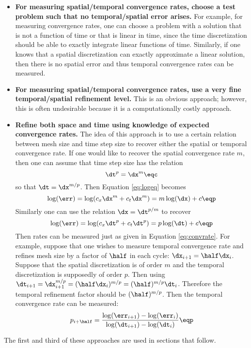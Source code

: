 \begin{itemize}
  \item \textbf{For measuring spatial/temporal convergence rates, choose a test problem
    such that no temporal/spatial error arises.} For example, for measuring
    convergence rates, one can choose a problem with a solution that is not
    a function of time or that is linear in time, since the time discretization
    should be able to exactly integrate linear functions of time.
    Similarly, if one knows that a spatial discretization can exactly
    approximate a linear solution, then there is no spatial error and thus
    temporal convergence rates can be measured.
  \item \textbf{For measuring spatial/temporal convergence rates, use a very
    fine temporal/spatial refinement level.}
    This is an obvious approach; however, this is often undesirable because it is
    a computationally costly approach.
  \item \textbf{Refine both space and time using knowledge of expected
    convergence rates.}
    The idea of this approach is to use a certain relation between mesh size
    and time step size to recover either the spatial or temporal convergence
    rate. If one would like to recover the spatial convergence rate $m$, then
    one can assume that time step size has the relation
    \begin{equation}
      \dt^p = \dx^m \eqc
    \end{equation}
    so that $\dt = \dx^{m/p}$. Then Equation \eqref{eq:logeq} becomes
    \begin{equation}
      \log(\err) = \log(c_{x}\dx^m + c_{t}\dx^m) = m\log(\dx) + c \eqp
    \end{equation}
    Similarly one can use the relation $\dx = \dt^{p/m}$ to recover
    \begin{equation}
      \log(\err) = \log(c_{x}\dt^p + c_{t}\dt^p) = p\log(\dt) + c \eqp
    \end{equation}
    Then rates can be measured just as given in Equation \eqref{eq:convrate}.
    For example, suppose that one wishes to measure temporal convergence rate
    and refines mesh size by a factor of $\half$ in each cycle:
    $\dx_{i+1} = \half\dx_i$. Suppose that the spatial discretization is of
    order $m$ and the temporal discretization is supposedly of order $p$.
    Then using $\dt_{i+1} = \dx_{i+1}^{m/p} = (\half\dx_i)^{m/p} =
    (\half)^{m/p}\dt_i$. Therefore the temporal refinement factor should
    be $(\half)^{m/p}$. Then the temporal convergence rate can be measured:
    \begin{equation}
      p_{i+\half} = \frac{\log(\err_{i+1}) - \log(\err_i)}
        {\log(\dt_{i+1}) - \log(\dt_i)}
      \eqp
    \end{equation}
\end{itemize}
The first and third of these approaches are used in sections that follow.

